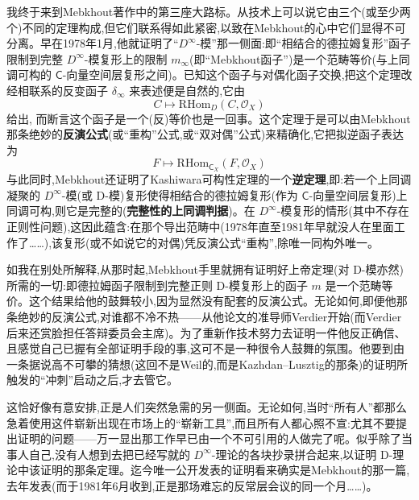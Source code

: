 \dmark{}我终于来到Mebkhout著作中的第三座大路标。从技术上可以说它由三个(或至少两个)不同的定理构成,但它们联系得如此紧密,以致在Mebkhout的心中它们显得不可分离。早在1978年1月,他就证明了“$D^{\infty}$-模”那一侧面:即“相结合的德拉姆复形”函子限制到完整 $D^{\infty}$-模复形上的限制 $m_{\infty}$(即“Mebkhout函子”)是一个范畴等价(与上同调可构的 $\mathsf{C}$-向量空间层复形之间)。已知这个函子与对偶化函子交换,把这个定理改经相联系的反变函子 $\delta_{\infty}$ 来表述便是自然的,它由
\begin{equation*}
C\longmapsto \mathrm{RHom}_{D}(C,\mathcal{O}_{X})
\tag{3}
\end{equation*}
给出,
而断言这个函子是一个(反)等价也是一回事。这个定理于是可以由Mebkhout那条绝妙的\textbf{反演公式}(或“重构”公式,或“双对偶”公式)来精确化,它把拟逆函子表达为
\begin{equation*}
F\longmapsto \mathrm{RHom}_{\mathsf{C}_{X}}(F,\mathcal{O}_{X})
\tag{4}
\end{equation*}
与此同时,Mebkhout还证明了Kashiwara可构性定理的一个\textbf{逆定理},即:若一个上同调凝聚的 $D^{\infty}$-模(或 D-模)复形使得相结合的德拉姆复形(作为 $\mathsf{C}$-向量空间层复形)上同调可构,则它是完整的(\textbf{完整性的上同调判据})。在 $D^{\infty}$-模复形的情形(其中不存在正则性问题),这因此蕴含:在那个\dmark{}导出范畴中(1978年直至1981年早就没人在里面工作了……),该复形(或不如说它的对偶)凭反演公式“重构”,除唯一同构外唯一。

\noindent 如我在别处所解释,从那时起,Mebkhout手里就拥有证明好上帝定理(对 D-模亦然)所需的一切:即德拉姆函子限制到完整正则 D-模复形上的函子 $m$ 是一个范畴等价。这个结果给他的鼓舞较小,因为显然没有配套的反演公式。无论如何,即便他那条绝妙的反演公式,对谁都不冷不热——从他论文的准导师Verdier开始(而Verdier后来还赏脸担任答辩委员会主席)。为了重新作技术努力去证明一件他反正确信、且感觉自己已握有全部证明手段的事,这可不是一种很令人鼓舞的氛围。他要到由一条据说高不可攀的猜想(这回不是Weil的,而是Kazhdan--Lusztig的那条)的证明所触发的“冲刺”启动之后,才去管它。

\noindent 这恰好像有意安排,正是人们突然急需的另一侧面。无论如何,当时“所有人”都那么急着使用这件崭新出现在市场上的“崭新工具”,而且所有人都心照不宣:尤其不要提出证明的问题——万一显出那工作早已由一个不可引用的人做完了呢。似乎除了当事人自己,没有人想到去把已经写就的 $D^{\infty}$-理论的各块抄录拼合起来,以证明 D-理论中该证明的那条定理。迄今唯一公开发表的证明看来确实是Mebkhout的那一篇,去年发表(而于1981年6月收到,正是那场难忘的反常层会议的同一个月……)。

